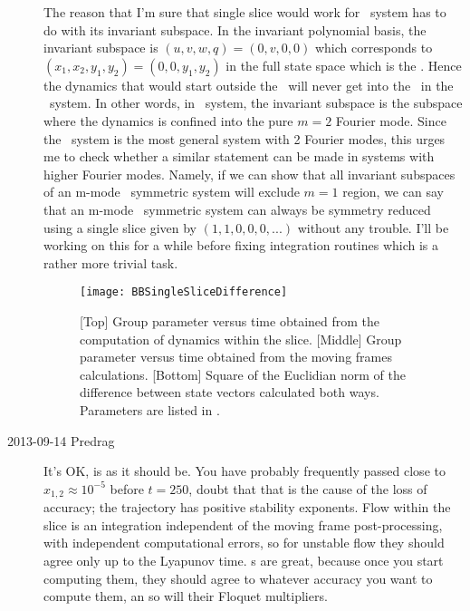 \begin{description}
The reason that I'm sure that single slice would work for \twomode\ system
has to do with its invariant subspace. In the invariant polynomial basis,
the invariant subspace is $(u,v,w,q) = (0,v,0,0)$ which corresponds to
$(x_1,x_2,y_1,y_2) = (0,0,y_1,y_2)$
in the full state space which is the \chartBord. Hence the dynamics that
would start outside the \chartBord\ will never get into the \chartBord\
in the \twomode\ system. In other words, in \twomode\ system, the invariant
subspace is the subspace where the dynamics is confined into the pure $m=2$
Fourier mode. Since the \twomode\ system is the most general system with
2 Fourier modes, this urges me to check whether a similar statement can
be made in systems with higher Fourier modes. Namely, if we can show that
all invariant subspaces of an m-mode \ symmetric system will exclude
$m = 1$ region, we can say that an m-mode \SOn{2}\ symmetric system can always
be symmetry reduced using a single slice given by $(1,1,0,0,0,...)$ without
any trouble. I'll be working on this for a while before fixing integration
routines which is a rather more trivial task.

\begin{figure}%
  \begin{center}
  \texttt{[image: BBSingleSliceDifference]}
  \end{center}
  \caption{
  [Top] Group parameter versus time obtained from the computation of
  dynamics within the slice. [Middle] Group parameter versus time
  obtained from the moving frames calculations. [Bottom] Square of
  the Euclidian norm of the difference between state vectors
  calculated both ways. Parameters are listed in .
  }
  \label{fig:BBSingleSliceDifference}
\end{figure}

\item[2013-09-14 Predrag] It's OK, 
is as it should be. You have probably frequently passed close to $x_{1,2} \approx 10^{-5}$
before $t=250$, doubt that that is the cause of the loss of accuracy;
the trajectory has positive stability exponents.
Flow within the slice is an integration independent
of the moving frame post-processing, with independent computational
errors, so for unstable flow they should agree only up to the Lyapunov
time. \Rpo s are great, because once you start computing them, they should
agree to whatever accuracy you want to compute them, an so will their
Floquet multipliers.



\end{description}
